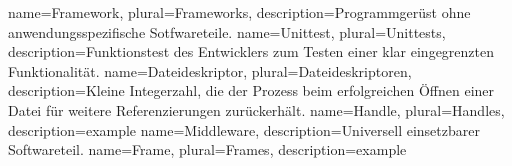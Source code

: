 \makeglossaries 

{
	name={Framework},  
	plural={Frameworks},
	description={Programmgerüst ohne anwendungsspezifische Sotfwareteile. \citep[S. 847]{gumm2011einfuhrung}}
}  
{
	name={Unittest},  
	plural={Unittests},
	description={Funktionstest des Entwicklers zum Testen einer klar eingegrenzten Funktionalität. \citep[S. 3]{hunt2004unit}}
}  
{
	name={Dateideskriptor},  
	plural={Dateideskriptoren},
	description={Kleine Integerzahl, die der Prozess beim erfolgreichen Öffnen einer Datei für weitere Referenzierungen zurückerhält. \citep[S. 25]{beck1994linux}}
}  
{
	name={Handle},  
	plural={Handles},
	description={example}
} 
{
	name={Middleware},  
	description={Universell einsetzbarer Softwareteil. \citep[S. 487]{sommerville2011software}}
} 
{
	name={Frame},
	plural={Frames},  
	description={example}
} 